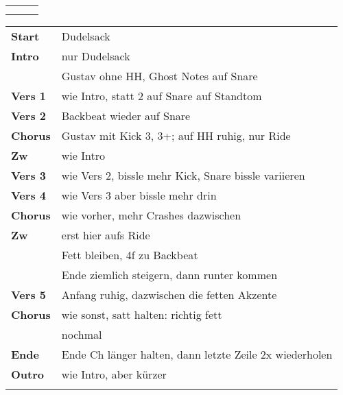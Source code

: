 

\begin{tabular}{p{0.6cm}p{12cm}p{1.4cm}}
	\rowcolor{cyan} \myRow{\thesongnumber} & \myRow{By Faith} & \myRow{76} \\
	                                       &                  &            \\
\end{tabular}

\begin{tabular}{p{1.6cm}l}
	\textbf{Start}  & Dudelsack                                               \\
	\textbf{Intro}  & nur Dudelsack                                           \\
	                & Gustav ohne HH, Ghost Notes auf Snare                   \\
	\textbf{Vers 1} & wie Intro, statt 2 auf Snare auf Standtom               \\
	\textbf{Vers 2} & Backbeat wieder auf Snare                               \\
	\textbf{Chorus} & Gustav mit Kick 3, 3+; auf HH ruhig, nur Ride           \\
	\textbf{Zw}     & wie Intro                                               \\
	\textbf{Vers 3} & wie Vers 2, bissle mehr Kick, Snare bissle variieren    \\
	\textbf{Vers 4} & wie Vers 3 aber bissle mehr drin                        \\
	\textbf{Chorus} & wie vorher, mehr Crashes dazwischen                     \\
	\textbf{Zw}     & erst hier aufs Ride                                     \\
	                & Fett bleiben, 4f zu Backbeat                            \\
	                & Ende ziemlich steigern, dann runter kommen              \\
	\textbf{Vers 5} & Anfang ruhig, dazwischen die fetten Akzente             \\
	\textbf{Chorus} & wie sonst, satt halten: richtig fett                    \\
	                & nochmal                                                 \\
	\textbf{Ende}   & Ende Ch länger halten, dann letzte Zeile 2x wiederholen \\
	\textbf{Outro}  & wie Intro, aber kürzer                                  \\
	                &                                                         \\
\end{tabular}
